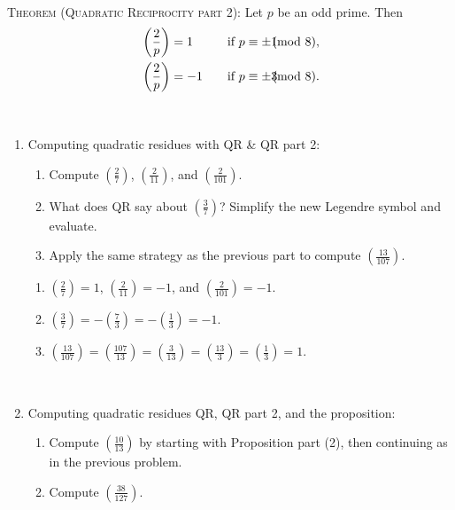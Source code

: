 \documentclass[12pt]{amsart}
\newcommand{\solution}[1]{\ifthenelse {\equal{\displaysol}{1}} {\begin{framed}{\color{meretale}\noindent #1}\end{framed}} { \ }}
\begin{document}
\begin{framed}
\

\noindent \textsc{Theorem (Quadratic Reciprocity part 2):} Let $p$ be an odd prime. Then
\[\begin{aligned} &\left( \frac{2}{p} \right) = 1 \quad &\text{if} \ p\equiv \pm 1\hspace{-3mm}\pmod 8,  \\
&\left( \frac{2}{p} \right) = -1 \quad &\text{if} \ p\equiv \pm 3\hspace{-3mm}\pmod 8.  \\ \end{aligned} \]

\end{framed}

\

\begin{enumerate}
\item Computing quadratic residues with QR \& QR part 2:
\begin{enumerate}
\item Compute $\left( \frac{2}{7}\right)$, $\left( \frac{2}{11}\right)$, and $\left( \frac{2}{101}\right)$.
\item What does QR say about $\left( \frac{3}{7}\right)$? Simplify the new Legendre symbol and evaluate.
\item Apply the same strategy as the previous part to compute $\left(\frac{13}{107}\right)$. 
\end{enumerate}

\solution{
\begin{enumerate}
\item $\left( \frac{2}{7}\right)=1$, $\left( \frac{2}{11}\right)=-1$, and $\left( \frac{2}{101}\right)=-1$.
\item  $\left( \frac{3}{7}\right)=-\left( \frac{7}{3}\right)=-\left( \frac{1}{3}\right)=-1$.
\item $\left(\frac{13}{107}\right)=\left( \frac{107}{13}\right)= \left( \frac{3}{13}\right) =\left( \frac{13}{3}\right)=\left( \frac{1}{3}\right)=1$. 
\end{enumerate}
}


\item Computing quadratic residues QR, QR part 2, and the proposition:
\begin{enumerate}
\item Compute $\left( \frac{10}{13}\right)$ by starting with Proposition part (2), then continuing as in the previous problem.
\item Compute $\left( \frac{38}{127}\right)$.
\end{enumerate}


\end{enumerate}
\end{document}
